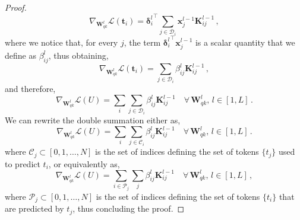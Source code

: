 \begin{proof}
%
\begin{equation}
    \nabla_{\bm{W}_{qk}^l} \mathcal{L}(\bm{t}_i) = {\bm{\delta}^l_i}^\top \sum_{j\in \mathcal{D}_i} \bm{x}^{l-1}_j \bm{K}^{l-1}_{ij} \,,
\end{equation}
%
where we notice that, for every $j$, the term ${\bm{\delta}^l_i}^\top \bm{x}^{l-1}_j$ is a scalar quantity that we define as $\beta^l_{ij}$, thus obtaining,
%
\begin{equation}
\label{eq:math:gradient-linear-combination-rank-1-matrices}
    \nabla_{\bm{W}_{qk}^l} \mathcal{L}(\bm{t}_i) = \sum_{j\in \mathcal{D}_i} \beta^l_{ij} \bm{K}^{l-1}_{ij} \,,
\end{equation}
%
and therefore,
%
\begin{equation}
    \nabla_{\bm{W}_{qk}^l} \mathcal{L}(U) = \sum_i \sum_{j\in \mathcal{D}_i} \beta^l_{ij} \bm{K}^{l-1}_{ij} \quad \forall\, \bm{W}_{qk}^l, \,l \in [1,L]\,.
\end{equation}
%
We can rewrite the double summation either as,
%
\begin{equation}
    \nabla_{\bm{W}_{qk}^l} \mathcal{L}(U) = \sum_i \sum_{j\in \mathcal{C}_i} \beta^l_{ij} \bm{K}^{l-1}_{ij} \quad \forall\, \bm{W}_{qk}^l, \,l \in [1,L]\,.
\end{equation}
%
where $\mathcal{C}_j \subset [0,1,\dots, N]$ is the set of indices defining the set of tokens $\{t_j\}$ used to predict $t_i$,
%
or equivalently as,
%
\begin{equation}
    \nabla_{\bm{W}_{qk}^l} \mathcal{L}(U) = \sum_{i \in \mathcal{P}_j} \sum_{j} \beta^l_{ij} \bm{K}^{l-1}_{ij} \quad \forall\, \bm{W}_{qk}^l, \,l \in [1,L]\,,
\end{equation}
%
where $\mathcal{P}_j \subset [0,1,\dots, N]$ is the set of indices defining the set of tokens $\{t_i\}$ that are predicted by $t_j$, thus concluding the proof.
%
\end{proof}
